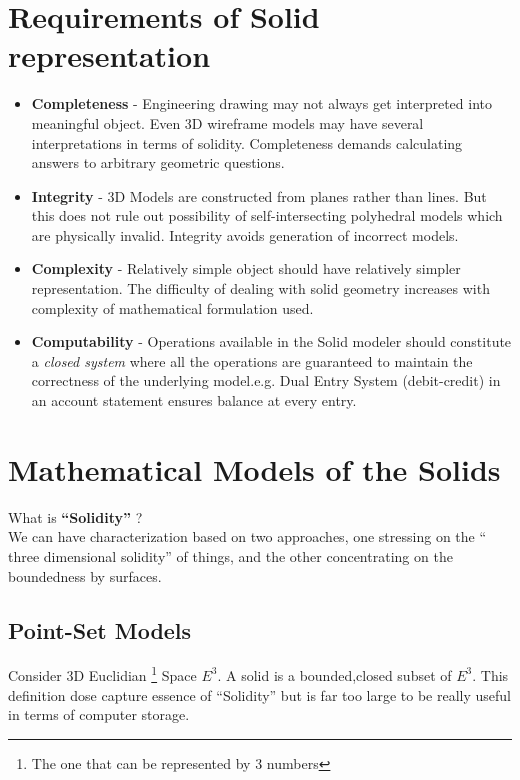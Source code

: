 \documentclass[12pt,a4paper,openbib]{article}
\begin{document}
\section{Requirements of Solid representation}
\begin{itemize}
	\item {\bf Completeness} - Engineering drawing may not always get 
	interpreted into meaningful object. Even 3D wireframe models may have 
	several	interpretations in terms of solidity. Completeness demands 
	calculating answers to arbitrary geometric questions.
	\item {\bf Integrity} - 3D Models are constructed from planes rather than 
	lines. But this does not rule out possibility of self-intersecting 
	polyhedral models which are physically invalid. Integrity avoids 
	generation of incorrect models.

	\item {\bf Complexity} - Relatively simple object should have relatively 
	simpler representation. The difficulty of dealing with solid geometry 
	increases with complexity of mathematical formulation used.
	\item {\bf Computability} - Operations available in the Solid modeler
	should constitute a {\it closed system} where all the operations are
	guaranteed to maintain the correctness of the underlying model.e.g.
	Dual Entry System (debit-credit) in an account statement ensures balance
	at every entry.
\end{itemize}
\section{Mathematical Models of the Solids}
What is {\bf ``Solidity''} ? 
\\
We can have characterization based on two approaches, one stressing on the 
`` three dimensional solidity'' of things, and the other concentrating on the
boundedness by surfaces.
\subsection{Point-Set Models}
Consider 3D Euclidian \footnote{The one that can be represented by 3 numbers}
Space $E^{3}$. A solid is a bounded,closed subset of $E^{3}$.  This definition 
dose capture essence of ``Solidity'' but is far too large to be really useful 
in terms of computer storage.
\end{document}
